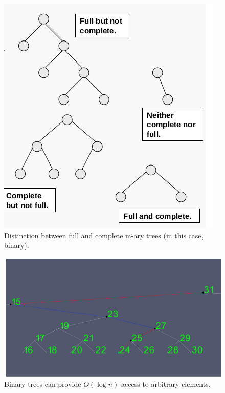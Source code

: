 \documentclass[a4paper,10pt]{report}
\begin{document}
\begin{figure}[H]
	\begin{centering}
	\begin{center}
	\includegraphics[width=\linewidth]{./full_complete.png}
	\caption{Distinction between full and complete m-ary trees (in this case, binary).}
	\label{fig:??????}
	\end{center}
	\par\end{centering}
\end{figure}

\begin{figure}[H]
	\begin{centering}
	\begin{center}
	\includegraphics[width=\linewidth]{./binary_tree_search.png}
	\caption{Binary trees can provide $O(\log n)$ access to arbitrary elements.}
	\label{fig:??????}
	\end{center}
	\par\end{centering}
\end{figure}
\end{document}
